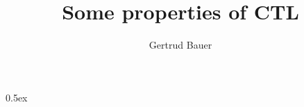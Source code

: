 \documentclass[11pt,a4paper]{article}
\begin{document}
\title{Some properties of CTL}
\author{Gertrud Bauer}
\maketitle

\tableofcontents
\bigskip

\parindent 0pt\parskip 0.5ex





\end{document}
